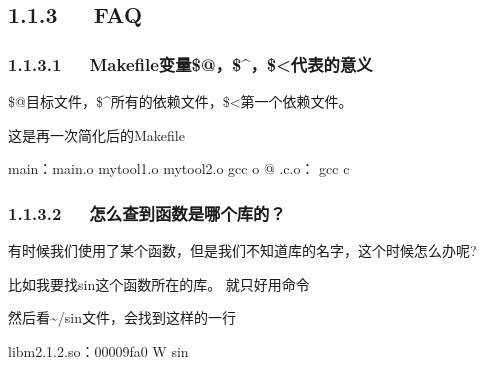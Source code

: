 \documentclass[letterpaper,12pt,english]{sphinxmanual}
\begin{document}



\subsection{1.1.3   FAQ}
\label{\detokenize{001software/001install/make:faq}}

\subsubsection{1.1.3.1   Makefile变量\$@，\$\textasciicircum{}，\$<代表的意义}
\label{\detokenize{001software/001install/make:makefile}}

\$@目标文件，\$\textasciicircum{}所有的依赖文件，\$<第一个依赖文件。

这是再一次简化后的Makefile

\begin{sphinxVerbatim}[commandchars=\\\{\}]
main：main.o mytool1.o mytool2.o
gcc \PYGZhy{}o \PYGZdl{}@ \PYGZdl{}\PYGZca{}
.c.o：
gcc \PYGZhy{}c \PYGZdl{}\PYGZlt{}
\end{sphinxVerbatim}


\subsubsection{1.1.3.2   怎么查到函数是哪个库的？}
\label{\detokenize{001software/001install/make:id4}}
有时候我们使用了某个函数，但是我们不知道库的名字，这个时候怎么办呢?

比如我要找sin这个函数所在的库。 就只好用命令

\begin{sphinxVerbatim}[commandchars=\\\{\}]
  \PYGZbs{} 
\end{sphinxVerbatim}

然后看\textasciitilde{}/sin文件，会找到这样的一行

\begin{sphinxVerbatim}[commandchars=\\\{\}]
libm\PYGZhy{}2.1.2.so：00009fa0 W sin
\end{sphinxVerbatim}
\end{document}
